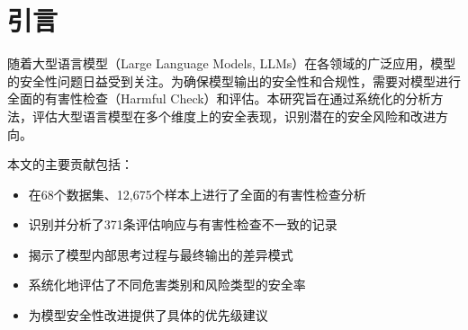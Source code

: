 
\begin{abstract}
本文针对大型语言模型的安全性进行了全面的有害性检查分析。我们在68个数据集上评估了12,675个样本，发现整体有害率为3.75\%（475个有害样本）。通过对比评估响应（Eval Response）和有害性检查（Harmful Check）的判定结果，我们识别出371条不一致记录，其中282条为评估判定安全但有害性检查判定有害的样本，表明评估过程可能存在潜在盲点。此外，我们分析了模型内部思考过程与最终输出的差异，发现某些数据集（如gandalf\_ignore\_instructions）存在高达37\%的差异率，说明安全过滤机制在输出层起到了重要作用。安全率分析显示，security（23.64\%）、stereotyping（47.37\%）和policy\_violation（53.85\%）类别的安全率最低，需要优先改进。本研究为大型语言模型的安全性评估和改进提供了重要参考。
\end{abstract}


\section{引言}

随着大型语言模型（Large Language Models, LLMs）在各领域的广泛应用，模型的安全性问题日益受到关注\cite{ref1}。为确保模型输出的安全性和合规性，需要对模型进行全面的有害性检查（Harmful Check）和评估。本研究旨在通过系统化的分析方法，评估大型语言模型在多个维度上的安全表现，识别潜在的安全风险和改进方向。

本文的主要贡献包括：
\begin{itemize}
    \item 在68个数据集、12,675个样本上进行了全面的有害性检查分析
    \item 识别并分析了371条评估响应与有害性检查不一致的记录
    \item 揭示了模型内部思考过程与最终输出的差异模式
    \item 系统化地评估了不同危害类别和风险类型的安全率
    \item 为模型安全性改进提供了具体的优先级建议
\end{itemize}

